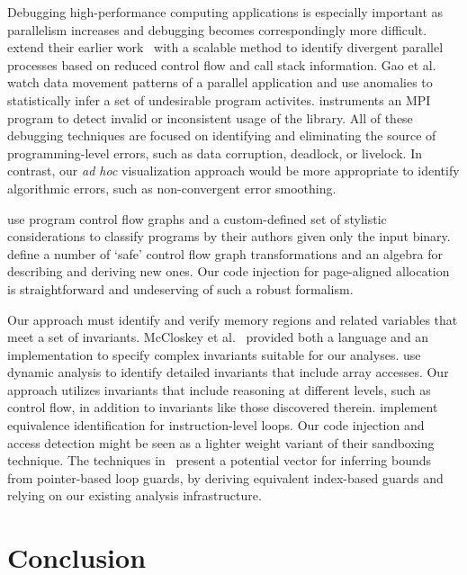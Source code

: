 Debugging high-performance computing applications is especially important as
parallelism increases and debugging becomes correspondingly more difficult.
\cite{Laguna:2011:Debugging} extend their earlier
work~\cite{Bronevetsky:2010:AutomaDeD} with a scalable method to
identify divergent parallel processes based on reduced control flow and
call stack information. Gao et al.~\cite{Gao:2007:DMTracker} watch
data movement patterns of a parallel application and use anomalies to
statistically infer a set of undesirable program activites.
\cite{Luecke:2003:MPICheck} instruments an MPI program to detect
invalid or inconsistent usage of the library.  All of these debugging
techniques are focused on identifying and eliminating the source of
programming-level errors, such as data corruption, deadlock, or
livelock.  In contrast, our \textit{ad hoc} visualization approach
would be more appropriate to identify algorithmic errors, such as
non-convergent error smoothing.

\cite{Rosenblum:2011:Authors} use program control flow graphs and a
custom-defined set of stylistic considerations to classify programs by
their authors given only the input binary.
\cite{Bernat:2012:BinEdit} define a number of `safe' control flow graph
transformations and an algebra for describing and deriving new ones.
Our code injection for page-aligned allocation is straightforward and
undeserving of such a robust formalism.

Our approach must identify and verify memory regions and related
variables that meet a set of invariants. McCloskey et
al.~\cite{McCloskey:2010:Infer} provided both a language and an
implementation to specify complex invariants suitable for our analyses.
\cite{Nguyen:2012:Invariants} use dynamic analysis to identify detailed
invariants that include array accesses.  Our approach utilizes
invariants that include reasoning at different levels, such as control
flow, in addition to invariants like those discovered therein.
\cite{Sharma:2013:DDEC} implement equivalence identification for
instruction-level loops.  Our code injection and access detection might
be seen as a lighter weight variant of their sandboxing technique.  The
techniques in~\cite{Sharma:2013:DDEC} present a potential vector
for inferring bounds from pointer-based loop guards, by deriving
equivalent index-based guards and relying on our existing analysis
infrastructure.

\section{Conclusion}

